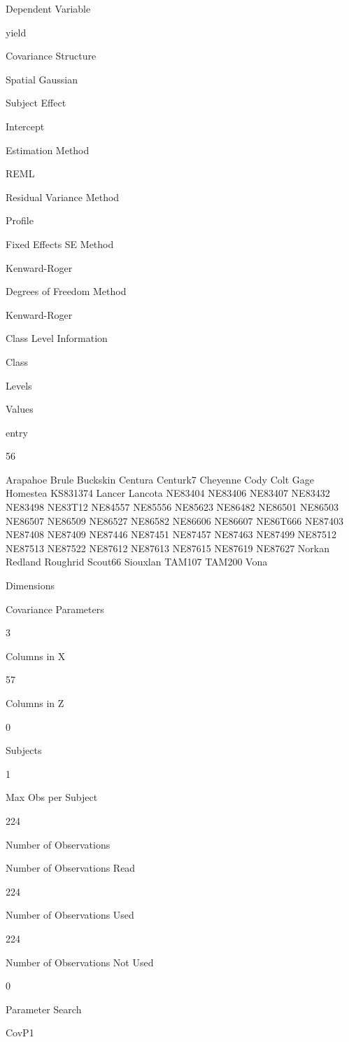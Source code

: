 \documentclass[
]{book}
\begin{document}
Dependent Variable

yield

Covariance Structure

Spatial Gaussian

Subject Effect

Intercept

Estimation Method

REML

Residual Variance Method

Profile

Fixed Effects SE Method

Kenward-Roger

Degrees of Freedom Method

Kenward-Roger

Class Level Information

Class

Levels

Values

entry

56

Arapahoe Brule Buckskin Centura Centurk7 Cheyenne Cody Colt Gage Homestea KS831374 Lancer Lancota NE83404 NE83406 NE83407 NE83432 NE83498 NE83T12 NE84557 NE85556 NE85623 NE86482 NE86501 NE86503 NE86507 NE86509 NE86527 NE86582 NE86606 NE86607 NE86T666 NE87403 NE87408 NE87409 NE87446 NE87451 NE87457 NE87463 NE87499 NE87512 NE87513 NE87522 NE87612 NE87613 NE87615 NE87619 NE87627 Norkan Redland Roughrid Scout66 Siouxlan TAM107 TAM200 Vona

Dimensions

Covariance Parameters

3

Columns in X

57

Columns in Z

0

Subjects

1

Max Obs per Subject

224

Number of Observations

Number of Observations Read

224

Number of Observations Used

224

Number of Observations Not Used

0

Parameter Search

CovP1
\end{document}
